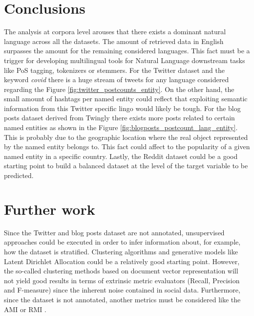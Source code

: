 \section{Conclusions}


The analysis at corpora level arouses that there exists a dominant natural language across all the datasets. The amount of retrieved data in English surpasses the amount for the remaining considered languages. This fact must be a trigger for developing multilingual tools for Natural Language downstream tasks like PoS tagging, tokenizers or stemmers. For the Twitter dataset and the keyword \textit{covid} there is a huge stream of tweets for any language considered regarding the Figure \ref{fig:twitter_postcounts_entity}. On the other hand, the small amount of hashtags per named entity could reflect that exploiting semantic information from this Twitter specific lingo would likely be tough. For the blog posts dataset derived from Twingly there exists more posts related to certain named entities as shown in the Figure \ref{fig:blogposts_postcount_lang_entity}. This is probably due to the geographic location where the real object represented by the named entity belongs to. This fact could affect to the popularity of a given named entity in a specific country. Lastly, the Reddit dataset could be a good starting point to build a balanced dataset at the level of the target variable to be predicted.

\par 


\section{Further work}
Since the Twitter and blog posts dataset are not annotated, unsupervised approaches could be executed in order to infer information about, for example, how the dataset is stratified. Clustering algorithms and generative models like Latent Dirichlet Allocation could be a relatively good starting point. However, the so-called clustering methods based on document vector representation will not yield good results in terms of extrinsic metric evaluators (Recall, Precision and F-measure) since the inherent noise contained in social data. Furthermore, since the dataset is not annotated, another metrics must be considered like the AMI or RMI \citep{clusteringTopicModellingTwitterReddit}.
